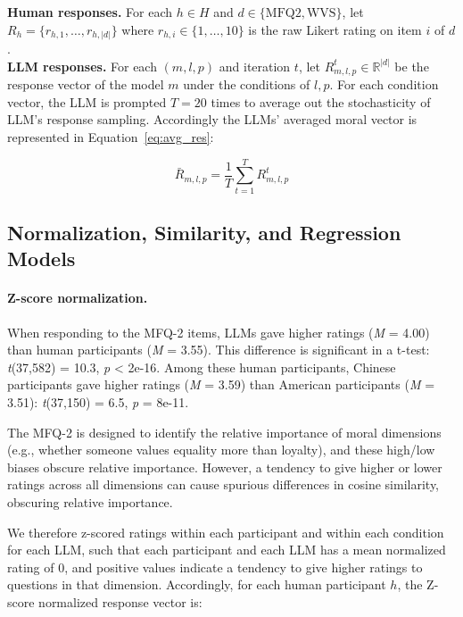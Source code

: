 \textbf{Human responses.} For each
\(h \in H\) and \(d \in \{\text{MFQ2}, \text{WVS}\}\),
let \(R_{h} = \{ r_{h,1},\ldots,r_{h,|d|}\}\) where
\(r_{h,i} \in \{ 1,\ldots,10\}\) is the raw Likert rating on item \(i\)
of \(d\).\\

\textbf{LLM responses.} For each \((m,l,p)\) and iteration \(t\), let
\(R_{m,l,p}^{t} \in \mathbb{R}^{|d|}\) be the response vector of the model \(m\)
under the conditions of \(l,p\). For each condition vector, the LLM is
prompted \(T=20\) times to average out the stochasticity of LLM's response sampling. Accordingly the LLMs' averaged moral vector is represented in Equation~\ref{eq:avg_res}:

\begin{equation}\label{eq:avg_res}
\bar{R}_{m,l,p} = \frac{1}{T}\sum_{t=1}^{T} R_{m,l,p}^{t}
\end{equation}

\subsection{Normalization, Similarity, and Regression Models}\label{subsec:norm_sim_reg}

\paragraph{Z-score normalization.}
When responding to the MFQ-2 items, LLMs gave higher ratings (\emph{M} =
4.00) than human participants (\emph{M} = 3.55). This difference is
significant in a t-test: \emph{t}(37,582) = 10.3, \emph{p} \textless{}
2e-16. Among these human participants, Chinese participants gave higher
ratings (\emph{M} = 3.59) than American participants (\emph{M} = 3.51):
\emph{t}(37,150) = 6.5, \emph{p} = 8e-11. 

The MFQ-2 is designed to
identify the relative importance of moral dimensions (e.g., whether
someone values equality more than loyalty), and these high/low biases
obscure relative importance. However, a tendency to give higher or lower
ratings across all dimensions can cause spurious differences in cosine
similarity, obscuring relative importance. 

We therefore z-scored ratings within each participant and within each
condition for each LLM, such that each participant and each LLM has a
mean normalized rating of 0, and positive values indicate a tendency to
give higher ratings to questions in that dimension. Accordingly, for
each human participant \(h\), the Z-score normalized response vector is:

